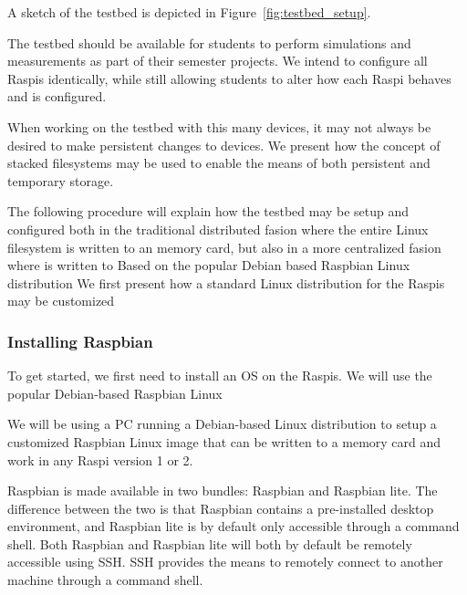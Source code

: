 A sketch of the testbed is depicted in Figure~\ref{fig:testbed_setup}.

The testbed should be available for students to perform simulations and
measurements as part of their semester projects. We intend to configure
all \ac{Raspi}s identically, while still allowing students to alter
how each \ac{Raspi} behaves and is configured.

When working on the testbed with this many devices, it may not always be
desired to make persistent changes to devices. We present how the concept
of stacked filesystems may be used to enable the means of both persistent
and temporary storage.

%


The following procedure will explain how the testbed may be setup and
configured both in the traditional distributed fasion where the
entire Linux filesystem is written to an memory card, but also in a more
centralized fasion where 
is written to
Based on the popular Debian based Raspbian Linux distribution
We
first present how a standard Linux distribution for the \ac{Raspi}s
may be customized 


\subsubsection{Installing Raspbian}

To get started, we first need to install an \ac{OS} on the
\ac{Raspi}s. We will use the popular Debian-based Raspbian
Linux~\cite{raspbian}

We will be using a \ac{PC} running a Debian-based Linux distribution
to setup a customized Raspbian Linux image that can be written to
a memory card and work in any \ac{Raspi} version 1 or 2.

Raspbian is made available in two bundles: Raspbian and Raspbian lite.
The difference between the two is that Raspbian contains a pre-installed desktop
environment, and Raspbian lite is by default only accessible through a 
command shell. Both Raspbian and Raspbian lite will both by default be remotely
accessible using \ac{SSH}. \ac{SSH} provides the means to remotely
connect to another machine through a command shell.

